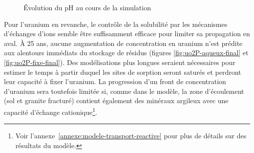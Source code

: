 \documentclass{article}
\begin{document}

\begin{figure}[H]   
    \centering
    \hfill
    \caption{Évolution du pH au cours de la simulation}
\end{figure}


Pour l’uranium en revanche, le contrôle de la solubilité par les mécanismes d’échanges d’ions semble être suffisamment efficace pour limiter sa propagation en aval. À 25 ans, aucune augmentation de concentration en uranium n’est prédite aux alentours immédiats du stockage de résidus (figures \ref{fig:uo2P-aqueux-final} et \ref{fig:uo2P-fixe-final}). Des modélisations plus longues seraient nécessaires pour estimer le temps à partir duquel les sites de sorption seront saturés et perdront leur capacité à fixer l’uranium. La progression d’un front de concentration d’uranium sera toutefois limitée si, comme dans le modèle, la zone d’écoulement (sol et granite fracturé) contient également des minéraux argileux avec une capacité d’échange cationique\footnote{Voir l'annexe~\ref{annexe:modele-transport-reactive} pour plus de détails sur des résultats du modèle.}.
\end{document}
